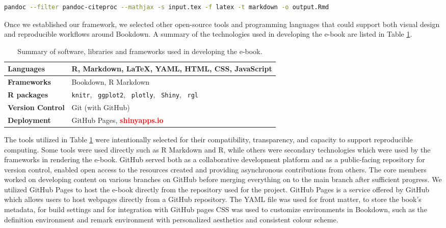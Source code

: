 \documentclass[11pt]{article}
\begin{document}
\begin{lstlisting}[language=bash,
                   caption={Conversion of a LaTeX .tex file to an R Markdown .Rmd file rendered with MathJax using Pandoc.},
                   label={lst:tex_to_rmd_mathjax},
                   captionpos=b] 
pandoc --filter pandoc-citeproc --mathjax -s input.tex -f latex -t markdown -o output.Rmd
\end{lstlisting}

Once we established our framework, we selected other open-source tools and programming languages that could support both visual design and reproducible workflows around Bookdown. A summary of the technologies used in developing the e-book are listed in Table \ref{tab:ebook_Technologies}.

\renewcommand\arraystretch{1.20}
\begin{table}[H]
\setlength{\belowcaptionskip}{-25pt}
\begin{center}
\begin{tabular}{| l | l |}
\hline
\textbf{Languages}		&	R, Markdown, LaTeX, YAML, HTML, CSS, JavaScript\\
\hline
\textbf{Frameworks} 		&	Bookdown, R Markdown\\
\hline
\textbf{R packages}		&	\texttt{knitr}, \, \texttt{ggplot2}, \, \texttt{plotly}, \, \texttt{Shiny}, \, \texttt{rgl}\\
\hline
\textbf{Version Control} 	&	Git (with GitHub)\\
\hline
\textbf{Deployment} 		&	GitHub Pages, \colorbox{yellow!34}{\textcolor{red}{\textbf{shinyapps.io}}}\\
\hline
\end{tabular}
\caption{Summary of software, libraries and frameworks used in developing the e-book.}
\label{tab:ebook_Technologies}
\end{center}
\end{table}
\renewcommand\arraystretch{1.00}

The tools utilized in Table \ref{tab:ebook_Technologies} were intentionally selected for their compatibility, transparency, and capacity to support reproducible computing. 
Some tools were used directly such as R Markdown and R, while others were secondary technologies which were used by the frameworks in rendering the e-book.
GitHub served both as a collaborative development platform and as a public-facing repository for version control, enabled open access to the resources created and providing asynchronous contributions from others.
The core members worked on developing content on various branches on GitHub before merging everything on to the main branch after sufficient progress.
We utilized GitHub Pages to host the e-book directly from the repository used for the project.
GitHub Pages is a service offered by GitHub which allows users to host webpages directly from a GitHub repository.
The YAML file was used for front matter, to store the book’s metadata, for build settings and for integration with GitHub pages
CSS was used to customize environments in Bookdown, such as the definition environment and remark environment with personalized aesthetics and consistent colour scheme.
\end{document}
